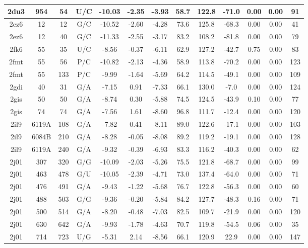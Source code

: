 {\begin{center}
\begin{longtable}{|c|c|c|c|c|c|c|c|c|c|c|c|c|}
2du3 & 954 & 54 & U/C & -10.03 & -2.35 & -3.93 & 58.7 & 122.8 & -71.0 & 0.00 & 0.00 & 91 \\ \hline
2ez6 & 12 & 12 & G/C & -10.52 & -2.60 & -4.28 & 73.6 & 125.8 & -68.3 & 0.00 & 0.00 & 41 \\ \hline
2ez6 & 12 & 40 & G/C & -11.33 & -2.55 & -3.17 & 83.2 & 108.2 & -81.8 & 0.00 & 0.00 & 79 \\ \hline
2fk6 & 55 & 35 & U/C & -8.56 & -0.37 & -6.11 & 62.9 & 127.2 & -42.7 & 0.75 & 0.00 & 83 \\ \hline
2fmt & 55 & 56 & P/C & -10.82 & -2.13 & -4.36 & 58.9 & 113.8 & -70.2 & 0.00 & 0.00 & 123 \\ \hline
2fmt & 55 & 133 & P/C & -9.99 & -1.64 & -5.69 & 64.2 & 114.5 & -49.1 & 0.00 & 0.00 & 109 \\ \hline
2gdi & 40 & 31 & G/A & -7.15 & 0.91 & -7.33 & 66.1 & 130.0 & -7.0 & 0.00 & 0.00 & 124 \\ \hline
2gis & 50 & 50 & G/A & -8.74 & 0.30 & -5.88 & 74.5 & 124.5 & -43.9 & 0.10 & 0.00 & 77 \\ \hline
2gis & 74 & 74 & G/A & -7.56 & 1.61 & -8.60 & 96.8 & 111.7 & -12.4 & 0.00 & 0.00 & 120 \\ \hline
2il9 & 6119A & 108 & G/A & -7.82 & 0.41 & -8.11 & 89.0 & 122.6 & -17.1 & 0.00 & 0.00 & 103 \\ \hline
2il9 & 6084B & 210 & G/A & -8.28 & -0.05 & -8.08 & 89.2 & 119.2 & -19.1 & 0.00 & 0.00 & 128 \\ \hline
2il9 & 6119A & 240 & G/A & -9.32 & -0.39 & -6.93 & 83.3 & 116.2 & -40.3 & 0.00 & 0.00 & 62 \\ \hline
2j01 & 307 & 320 & G/G & -10.09 & -2.03 & -5.26 & 75.5 & 121.8 & -68.7 & 0.00 & 0.00 & 99 \\ \hline
2j01 & 463 & 478 & G/U & -10.05 & -2.39 & -4.71 & 73.0 & 137.4 & -64.0 & 0.00 & 0.00 & 71 \\ \hline
2j01 & 476 & 491 & G/A & -9.43 & -1.22 & -5.68 & 76.7 & 122.8 & -56.3 & 0.00 & 0.00 & 60 \\ \hline
2j01 & 488 & 503 & G/G & -9.36 & -0.20 & -5.84 & 84.2 & 127.7 & -48.3 & 0.16 & 0.00 & 71 \\ \hline
2j01 & 500 & 514 & G/A & -8.20 & -0.48 & -7.03 & 82.5 & 109.7 & -21.9 & 0.00 & 0.00 & 120 \\ \hline
2j01 & 630 & 642 & G/A & -9.93 & -1.78 & -4.63 & 70.7 & 119.8 & -54.5 & 0.06 & 0.00 & 35 \\ \hline
2j01 & 714 & 723 & U/G & -5.31 & 2.14 & -8.56 & 66.1 & 120.9 & 22.9 & 0.00 & 0.00 & 147 \\ \hline

\end{longtable}
\end{center}}
